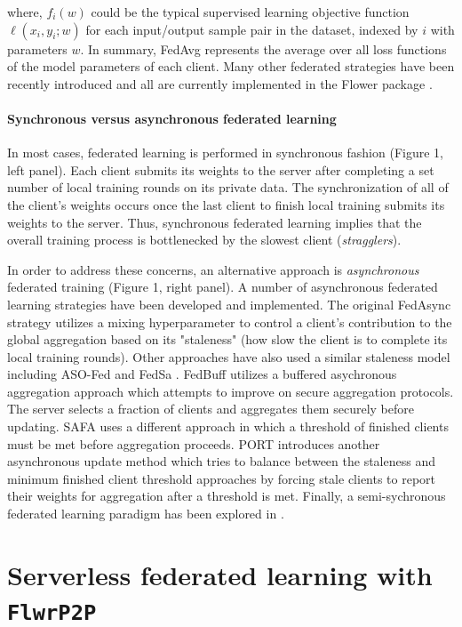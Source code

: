 \documentclass[twocolumn, switch]{article} %
\begin{document}
where, $f_i(w)$ could be the typical supervised learning objective function $\ell(x_i, y_i; w)$ for each input/output sample pair in the dataset, indexed by $i$ with parameters $w$. In summary, FedAvg represents the average over all loss functions of the model parameters of each client. Many other federated strategies have been recently introduced and all are currently implemented in the Flower package \cite{flower}.

\paragraph{Synchronous versus asynchronous federated learning}

In most cases, federated learning is performed in synchronous fashion (Figure 1, left panel). Each client submits its weights to the server after completing a set number of local training rounds on its private data. The synchronization of all of the client's weights occurs once the last client to finish local training submits its weights to the server. Thus, synchronous federated learning implies that the overall training process is bottlenecked by the slowest client (\textit{stragglers}).

In order to address these concerns, an alternative approach is \textit{asynchronous} federated training (Figure 1, right panel).  A number of asynchronous federated learning strategies have been developed and implemented. The original FedAsync \cite{fedasync} strategy utilizes a mixing hyperparameter to control a client's contribution to the global aggregation based on its "staleness" (how slow the client is to complete its local training rounds). Other approaches have also used a similar staleness model including ASO-Fed \cite{asofed} and FedSa \cite{fedsa}. FedBuff \cite{fedbuff, fedbuff2} utilizes a buffered asychronous aggregation approach which attempts to improve on secure aggregation protocols. The server selects a fraction of clients and aggregates them securely before updating. SAFA \cite{safa} uses a different approach in which a threshold of finished clients must be met before aggregation proceeds. PORT \citep{fed_async1} introduces another asynchronous update method which tries to balance between the staleness and minimum finished client threshold approaches by forcing stale clients to report their weights for aggregation after a threshold is met. Finally, a semi-sychronous federated learning paradigm has been explored in \cite{semi}.

\section{Serverless federated learning with \texttt{FlwrP2P}}
\end{document}
